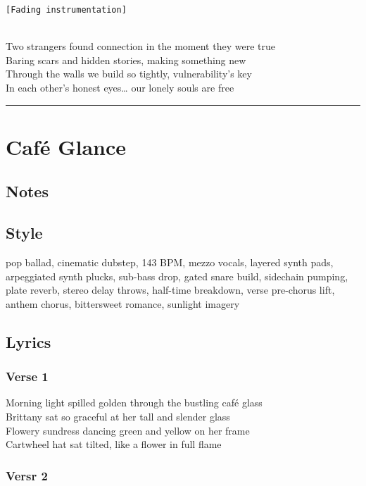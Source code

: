 \documentclass[]{article}
\begin{document}
\texttt{{[}Fading\ instrumentation{]}}\strut \\
Two strangers found connection in the moment they were true\\
Baring scars and hidden stories, making something new\\
Through the walls we build so tightly, vulnerability's key\\
In each other's honest eyes\ldots{} our lonely souls are free

\begin{center}\rule{0.5\linewidth}{0.5pt}\end{center}

\section{Café Glance}\label{cafuxe9-glance}

\subsection{Notes}\label{notes-44}

\subsection{Style}\label{style-44}

pop ballad, cinematic dubstep, 143 BPM, mezzo vocals, layered synth
pads, arpeggiated synth plucks, sub-bass drop, gated snare build,
sidechain pumping, plate reverb, stereo delay throws, half-time
breakdown, verse pre-chorus lift, anthem chorus, bittersweet romance,
sunlight imagery

\subsection{Lyrics}\label{lyrics-44}

\subsubsection{Verse 1}\label{verse-1-27}

Morning light spilled golden through the bustling café glass\\
Brittany sat so graceful at her tall and slender glass\\
Flowery sundress dancing green and yellow on her frame\\
Cartwheel hat sat tilted, like a flower in full flame

\subsubsection{Versr 2}\label{versr-2}
\end{document}
